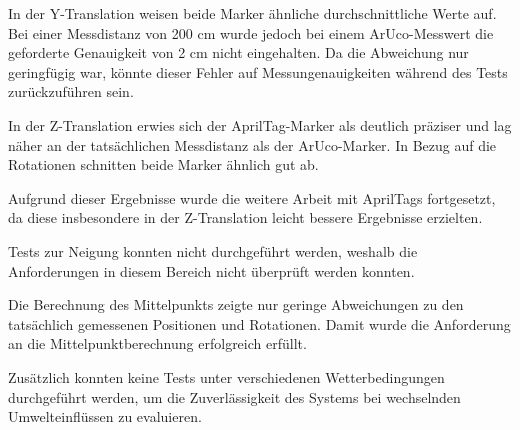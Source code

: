 In der Y-Translation weisen beide Marker ähnliche durchschnittliche Werte auf. Bei einer Messdistanz von 200 cm wurde jedoch bei einem ArUco-Messwert die geforderte Genauigkeit von 2 cm nicht eingehalten. Da die Abweichung nur geringfügig war, könnte dieser Fehler auf Messungenauigkeiten während des Tests zurückzuführen sein.

In der Z-Translation erwies sich der AprilTag-Marker als deutlich präziser und lag näher an der tatsächlichen Messdistanz als der ArUco-Marker. In Bezug auf die Rotationen schnitten beide Marker ähnlich gut ab.

Aufgrund dieser Ergebnisse wurde die weitere Arbeit mit AprilTags fortgesetzt, da diese insbesondere in der Z-Translation leicht bessere Ergebnisse erzielten.

Tests zur Neigung konnten nicht durchgeführt werden, weshalb die Anforderungen in diesem Bereich nicht überprüft werden konnten.

Die Berechnung des Mittelpunkts zeigte nur geringe Abweichungen zu den tatsächlich gemessenen Positionen und Rotationen. Damit wurde die Anforderung an die Mittelpunktberechnung erfolgreich erfüllt.

Zusätzlich konnten keine Tests unter verschiedenen Wetterbedingungen durchgeführt werden, um die Zuverlässigkeit des Systems bei wechselnden Umwelteinflüssen zu evaluieren.

